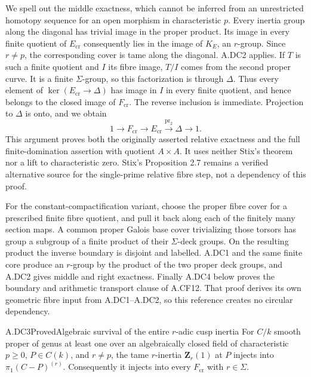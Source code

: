 We spell out the middle exactness, which cannot be inferred from an
unrestricted homotopy sequence for an open morphism in characteristic
$p$. Every inertia group along the diagonal has trivial image in the
proper product. Its image in every finite quotient of
$E_{\mathrm{cr}}$ consequently lies in the image of $K_E$, an
$r$-group. Since $r\ne p$, the corresponding cover is tame along the
diagonal. A.DC2 applies. If $T$ is such a finite quotient and $I$ its
fibre image, $T/I$ comes from the second proper curve. It is a finite
$\Sigma$-group, so this factorization is through $\Delta$.
Thus every element of $\ker(E_{\mathrm{cr}}\to\Delta)$ has image in
$I$ in every finite quotient, and hence belongs to the closed image
of $F_{\mathrm{cr}}$. The reverse inclusion is immediate. Projection
to $\Delta$ is onto, and we obtain
\[
 1\to F_{\mathrm{cr}}\to E_{\mathrm{cr}}
 \overset{\operatorname{pr}_2}{\longrightarrow}\Delta\to1.
\]
This argument proves both the originally asserted relative exactness
and the full finite-domination assertion with quotient $A\times A$.
It uses neither Stix's theorem nor a lift to characteristic zero.
Stix's Proposition 2.7 remains a verified alternative source for the
single-prime relative fibre step, not a dependency of this proof.

For the constant-compactification variant, choose the proper fibre
cover for a prescribed finite fibre quotient, and pull it back along
each of the finitely many section maps. A common proper Galois base
cover trivializing those torsors has group a subgroup of a finite
product of their $\Sigma$-deck groups. On the resulting product the
inverse boundary is disjoint and labelled. A.DC1 and the same finite
core produce an $r$-group by the product of the two proper deck
groups, and A.DC2 gives middle and right exactness. Finally A.DC4
below proves the boundary and arithmetic transport clause of A.CF12.
That proof derives its own geometric fibre input from A.DC1--A.DC2,
so this reference creates no circular dependency.

\begin{claim}{A.DC3}{Proved}{Algebraic survival of the entire $r$-adic cusp inertia}
For $C/k$ smooth proper of genus at least one over an algebraically
closed field of characteristic $p\geq0$, $P\in C(k)$, and $r\ne p$,
the tame $r$-inertia $\mathbf Z_r(1)$ at $P$ injects into
$\pi_1(C-P)^{(r)}$. Consequently it injects into every
$F_{\mathrm{cr}}$ with $r\in\Sigma$.
\end{claim}

